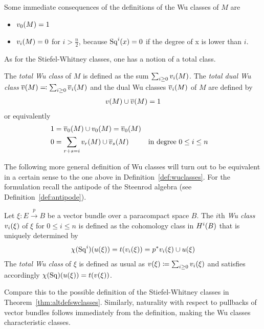 \begin{Rem}
  Some immediate consequences of the definitions of the Wu classes of
  $M$ are
  \begin{itemize}
  \item ${v_{0}}(M) = 1$
  \item ${v_{i}}(M) = 0$ for $i>\frac n 2$, because $\mathrm{Sq}^{i}(x) = 0$ if the
    degree of x is lower than $i$.
  \end{itemize}
\end{Rem}

As for the Stiefel-Whitney classes, one has a notion of a total class.
\begin{Def}\label{def:dualwuclasses}
  The \emph{total Wu class} of $M$ is defined as the sum
  $\sum_{i\geq0}{v_{i}}(M)$. The \emph{total dual Wu class}
  ${\overline{v}}(M)\eqqcolon \sum_{i\geq 0}{\overline{v}_{i}}(M)$
  and the dual Wu classes ${\overline{v}_{i}}(M)$
  of $M$ are defined by
  \begin{gather*}
    {v}(M) \cup {\overline{v}}(M) = 1
  \end{gather*}
  or equivalently
  \begin{align*}
    1 &= {\overline{v}_{0}}(M) \cup {v_{0}}(M) = {\overline{v}_{0}}(M) \\
    0 &= \sum_{r+s=i}{v_{r}}(M)\cup{\overline{v}_{s}}(M)
      &&\text{in degree $0\leq i\leq n$}
  \end{align*}
\end{Def}

The following more general definition of Wu classes
will turn out to be equivalent in a certain sense to the one above in
Definition~\ref{def:wuclasses}.
For the formulation recall the antipode of the Steenrod algebra
(see Definition~\ref{def:antipode}).
\begin{Def}\label{def:altwuclasses}
  Let $\xi\colon E\xrightarrow{p} B$ be a vector bundle over a
  paracompact space $B$.
  The $i$th \emph{Wu class} ${v_{i}}(\xi)$ of $\xi$ for $0\leq i\leq n$
  is defined as the cohomology class in $H^i(B)$ that is uniquely
  determined by
  \begin{gather*}
    \chi(\mathrm{Sq}^{i})({u}(\xi)) = t({v_{i}}(\xi)) = {p}^* {v_{i}}(\xi) \cup {u}(\xi)
  \end{gather*}
  The \emph{total Wu class} of $\xi$ is defined as usual as
  ${v}(\xi)\coloneqq\sum_{i\geq0}{v_{i}}(\xi)$ and satisfies accordingly 
  $\chi(\mathrm{Sq})({u}(\xi))=t({v}(\xi))$.
\end{Def}
\begin{Rem}
  Compare this to the possible definition of the Stiefel-Whitney
  classes in Theorem~\ref{thm:altdefswclasses}.
  Similarly, naturality with respect to pullbacks of vector bundles
  follows immediately from the definition, making the Wu classes
  characteristic classes.
\end{Rem}

